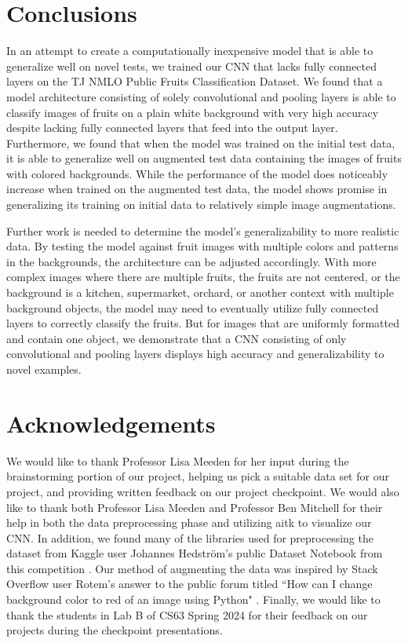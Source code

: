 \documentclass[11pt]{article}
\begin{document}
\section{Conclusions}
In an attempt to create a computationally inexpensive model that is able to generalize well on novel tests, we trained our CNN that lacks fully connected layers on the TJ NMLO Public Fruits Classification Dataset. We found that a model architecture consisting of solely convolutional and pooling layers is able to classify images of fruits on a plain white background with very high accuracy despite lacking fully connected layers that feed into the output layer. Furthermore, we found that when the model was trained on the initial test data, it is able to generalize well on augmented test data containing the images of fruits with colored backgrounds. While the performance of the model does noticeably increase when trained on the augmented test data, the model shows promise in generalizing its training on initial data to relatively simple image augmentations. 

Further work is needed to determine the model's generalizability to more realistic data. By testing the model against fruit images with multiple colors and patterns in the backgrounds, the architecture can be adjusted accordingly. With more complex images where there are multiple fruits, the fruits are not centered, or the background is a kitchen, supermarket, orchard, or another context with multiple background objects, the model may need to eventually utilize fully connected layers to correctly classify the fruits. But for images that are uniformly formatted and contain one object, we demonstrate that a CNN consisting of only convolutional and pooling layers displays high accuracy and generalizability to novel examples. 

\section{Acknowledgements}
We would like to thank Professor Lisa Meeden for her input during the brainstorming portion of our project, helping us pick a suitable data set for our project, and providing written feedback on our project checkpoint. We would also like to thank both Professor Lisa Meeden and Professor Ben Mitchell for their help in both the data preprocessing phase and utilizing aitk to visualize our CNN. 
In addition, we found many of the libraries used for preprocessing the dataset from Kaggle user Johannes Hedström's public Dataset Notebook from this competition \cite{100_accuracy_fruitdataset}. Our method of augmenting the data was inspired by Stack Overflow user Rotem's answer to the public forum titled ``How can I change background color to red of an image using Python" \cite{stackoverflow_redbackground}. Finally, we would like to thank the students in Lab B of CS63 Spring 2024 for their feedback on our projects during the checkpoint presentations. 
\clearpage

 
 
\end{document}
